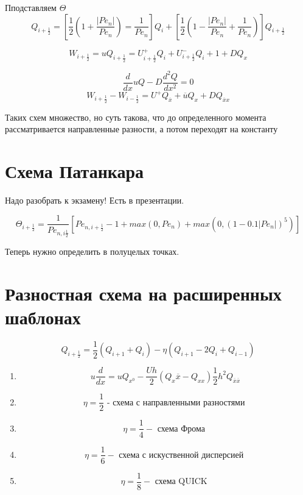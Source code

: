 \documentclass[14pt]{extarticle}
\begin{document}
Пподставляем $ \Theta $
\[ Q_{i+\frac{1}{2}} = [ \frac{1}{2} (1 + \frac{|{Pe}_n|}{{Pe}_n}) = \frac{1}{{Pe}_n}] Q_i + [\frac{1}{2} (1 - \frac{|{Pe}_n|}{{Pe}_n} + \frac{1}{{Pe}_n })]Q_{i+\frac{1}{2}} \]

\[ W_{i+\frac{1}{2}} = u Q_{i+\frac{1}{2}} = U^+_{i+\frac{1}{2}} Q_i + U^-_{i+\frac{1}{2}} Q_i+1 + D Q_x \]

\[ \frac{d }{dx }u Q - D \frac{d^2Q }{dx^2} = 0 \]
\[ W_{i+\frac{1}{2}} - W_{i-\frac{1}{2}} = U^+ Q_{\overline{x}} + \overline{u} Q_x + D Q_{\overline{x}x} \]

Таких схем множество, но суть такова, что до определенного момента рассматривается направленные разности, а потом переходят на константу

\section{Схема Патанкара}

Надо разобрать к экзамену! Есть в презентации. 

\[ \Theta_{i+\frac{1}{2}} = \frac{1}{{Pe}_{n, i \frac{1}{2}}}[{Pe}_{n, i+\frac{1}{2}} - 1 + max(0, {Pe}_n) + max(0, (1 - 0.1 |{Pe}_n|)^5)] \]

Теперь нужно определить в полуцелых точках.

\section{Разностная схема на расширенных шаблонах}

\[ Q_{i+\frac{1}{2}} = \frac{1}{2} (Q_{i+1} + Q_{i}) - \eta ( Q_{i+1} - 2 Q_i + Q_{i-1}) \]

\begin{enumerate}
	\item \[ u \frac{d }{dx} = u Q_{x^0} -\frac{U h }{2}( Q_x \overline{x} - Q_{x x})    \frac{1}{2} h^2 Q_{\overline{x} \overline{x} } \]

	\item
	\[ \eta = \frac{1}{2} \textrm{ - схема с направленными разностями } \]

	\item
	\[ \eta = \frac{1}{4} -\textrm{  схема Фрома } \]
	\item
	\[ \eta = \frac{1}{6} -\textrm{  схема с искуственной дисперсией }\]
	\item
	\[ \eta = \frac{1}{8} -\textrm{  схема QUICK  }\]

\end{enumerate}
\end{document}

